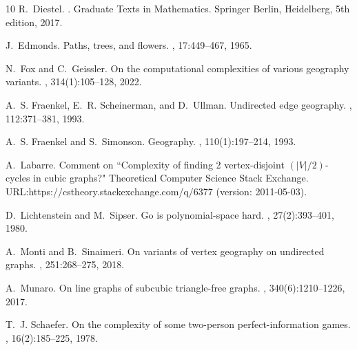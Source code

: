 \documentclass{article}
\theoremstyle{plain}
\theoremstyle{definition}
\begin{document}
\begin{thebibliography}{10}
R.~Diestel.
.
\newblock Graduate Texts in Mathematics. Springer Berlin, Heidelberg, 5th edition, 2017.

J.~Edmonds.
\newblock Paths, trees, and flowers.
, 17:449--467, 1965.

N.~Fox and C.~Geissler.
\newblock On the computational complexities of various geography variants.
, 314(1):105--128, 2022.

A.~S. Fraenkel, E.~R. Scheinerman, and D.~Ullman.
\newblock Undirected edge geography.
, 112:371--381, 1993.

A.~S. Fraenkel and S.~Simonson.
\newblock Geography.
, 110(1):197--214, 1993.


A.~Labarre.
\newblock Comment on ``Complexity of finding 2 vertex-disjoint $(|V|/2)$-cycles in cubic graphs?"
\newblock Theoretical Computer Science Stack Exchange.
\newblock URL:https://cstheory.stackexchange.com/q/6377 (version: 2011-05-03).

D.~Lichtenstein and M.~Sipser.
\newblock Go is polynomial-space hard.
, 27(2):393--401, 1980.

A.~Monti and B.~Sinaimeri.
\newblock On variants of vertex geography on undirected graphs.
, 251:268--275, 2018.

A.~Munaro.
\newblock On line graphs of subcubic triangle-free graphs.
, 340(6):1210--1226, 2017.

T.~J. Schaefer.
\newblock On the complexity of some two-person perfect-information games.
, 16(2):185--225, 1978.



\end{thebibliography}
\end{document}
